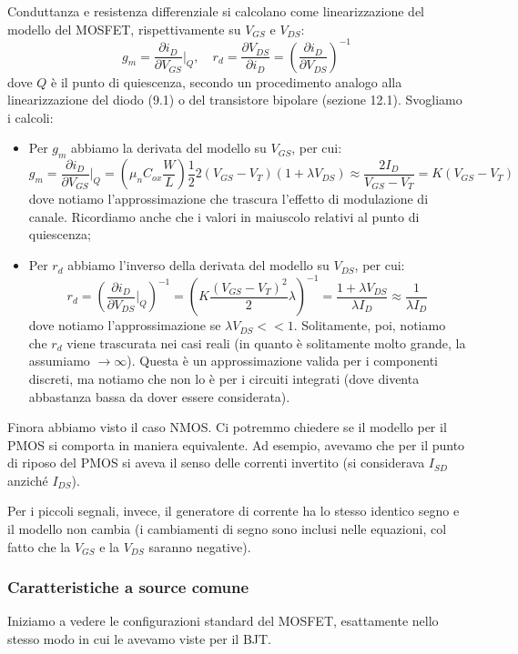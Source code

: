 \documentclass[a4paper,11pt]{article}
\begin{document}
Conduttanza e resistenza differenziale si calcolano come linearizzazione del modello del MOSFET, rispettivamente su $V_{GS}$ e $V_{DS}$:
$$
g_m = \frac{\partial i_D}{\partial V_{GS}} \Big|_Q, \quad
r_d = \frac{\partial V_{DS}}{\partial i_{D}} = \left( \frac{\partial i_{D}}{\partial V_{DS}} \right)^{-1}
$$
dove $Q$ è il punto di quiescenza, secondo un procedimento analogo alla linearizzazione del diodo (9.1) o del transistore bipolare (sezione 12.1).
Svogliamo i calcoli:
\begin{itemize}
\item Per $g_m$ abbiamo la derivata del modello su $V_{GS}$, per cui:
$$
g_m = \frac{\partial i_D}{\partial V_{GS}} \Big|_Q = \left(\mu_n C_{ox} \frac{W}{L}\right) \frac{1}{2} 2 (V_{GS} - V_T) (1 + \lambda V_{DS}) \approx \frac{2 I_D}{V_{GS} - V_T} = K(V_{GS} - V_T)
$$
dove notiamo l'approssimazione che trascura l'effetto di modulazione di canale.
Ricordiamo anche che i valori in maiuscolo relativi al punto di quiescenza;
\item Per $r_d$ abbiamo l'inverso della derivata del modello su $V_{DS}$, per cui:
$$
r_d = \left( \frac{\partial i_D}{\partial V_{DS}}  \Big|_Q \right)^{-1}
= \left( K \frac{(V_{GS} - V_T)^2}{2} \lambda \right)^{-1} = \frac{1 + \lambda V_{DS}}{\lambda I_D} \approx \frac{1}{\lambda I_D}
$$
dove notiamo l'approssimazione se $\lambda V_{DS} << 1$.
Solitamente, poi, notiamo che $r_d$ viene trascurata nei casi reali (in quanto è solitamente molto grande, la assumiamo $\rightarrow \infty$). Questa è un approssimazione valida per i componenti discreti, ma notiamo che non lo è per i circuiti integrati (dove diventa abbastanza bassa da dover essere considerata). 
\end{itemize}

\par\smallskip

Finora abbiamo visto il caso NMOS. Ci potremmo chiedere se il modello per il PMOS si comporta in maniera equivalente. Ad esempio, avevamo che per il punto di riposo del PMOS si aveva il senso delle correnti invertito (si considerava $I_{SD}$ anziché $I_{DS}$).

Per i piccoli segnali, invece, il generatore di corrente ha lo stesso identico segno e il modello non cambia (i cambiamenti di segno sono inclusi nelle equazioni, col fatto che la $V_{GS}$ e la $V_{DS}$ saranno negative). 

\subsubsection{Caratteristiche a source comune}
Iniziamo a vedere le configurazioni standard del MOSFET, esattamente nello stesso modo in cui le avevamo viste per il BJT.
\end{document}
